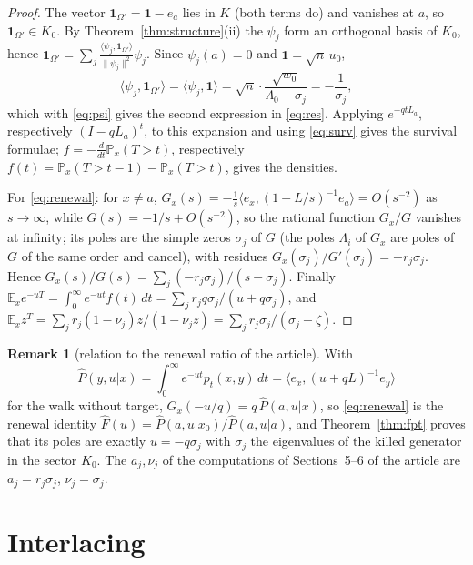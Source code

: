 \documentclass[11pt,a4paper]{article}
\newcommand{\one}{\mathbf 1}
\newcommand{\E}{\mathbb E}
\newcommand{\PP}{\mathbb P}
\newcommand{\ip}[2]{\langle #1,#2\rangle}
\theoremstyle{plain}
\theoremstyle{definition}
\newtheorem{remark}[theorem]{Remark}
\numberwithin{equation}{section}
\begin{document}
\begin{proof}
The vector $\one_{\Omega'}=\one-e_a$ lies in $K$ (both terms do) and vanishes at $a$, so $\one_{\Omega'}\in K_0$. By Theorem~\ref{thm:structure}(ii) the $\psi_j$ form an orthogonal basis of $K_0$, hence $\one_{\Omega'}=\sum_j\frac{\ip{\psi_j}{\one_{\Omega'}}}{\|\psi_j\|^2}\psi_j$. Since $\psi_j(a)=0$ and $\one=\sqrt n\,u_0$,
\[
\ip{\psi_j}{\one_{\Omega'}}=\ip{\psi_j}{\one}=\sqrt n\cdot\frac{\sqrt{w_0}}{\Lambda_0-\sigma_j}=-\frac1{\sigma_j},
\]
which with \eqref{eq:psi} gives the second expression in \eqref{eq:res}. Applying $e^{-qtL_a}$, respectively $(I-qL_a)^t$, to this expansion and using \eqref{eq:surv} gives the survival formulae; $f=-\frac{d}{dt}\PP_x(T>t)$, respectively $f(t)=\PP_x(T>t-1)-\PP_x(T>t)$, gives the densities.

For \eqref{eq:renewal}: for $x\ne a$, $G_x(s)=-\frac1s\ip{e_x}{(1-L/s)^{-1}e_a}=O(s^{-2})$ as $s\to\infty$, while $G(s)=-1/s+O(s^{-2})$, so the rational function $G_x/G$ vanishes at infinity; its poles are the simple zeros $\sigma_j$ of $G$ (the poles $\Lambda_i$ of $G_x$ are poles of $G$ of the same order and cancel), with residues $G_x(\sigma_j)/G'(\sigma_j)=-r_j\sigma_j$. Hence $G_x(s)/G(s)=\sum_j(-r_j\sigma_j)/(s-\sigma_j)$. Finally $\E_xe^{-uT}=\int_0^\infty e^{-ut}f(t)\,dt=\sum_jr_jq\sigma_j/(u+q\sigma_j)$, and $\E_xz^T=\sum_jr_j(1-\nu_j)z/(1-\nu_jz)=\sum_j r_j\sigma_j/(\sigma_j-\zeta)$.
\end{proof}

\begin{remark}[relation to the renewal ratio of the article]
With
\[\widehat P(y,u|x)=\int_0^\infty e^{-ut}p_t(x,y)\,dt=\ip{e_x}{(u+qL)^{-1}e_y}\]
for the walk without target, $G_x(-u/q)=q\,\widehat P(a,u|x)$, so \eqref{eq:renewal} is the renewal identity $\widehat F(u)=\widehat P(a,u|x_0)/\widehat P(a,u|a)$, and Theorem~\ref{thm:fpt} proves that its poles are exactly $u=-q\sigma_j$ with $\sigma_j$ the eigenvalues of the killed generator in the sector $K_0$. The $a_j,\nu_j$ of the computations of Sections~5--6 of the article are $a_j=r_j\sigma_j$, $\nu_j=\sigma_j$.
\end{remark}

\section{Interlacing}\label{sec:interlacing}
\end{document}
